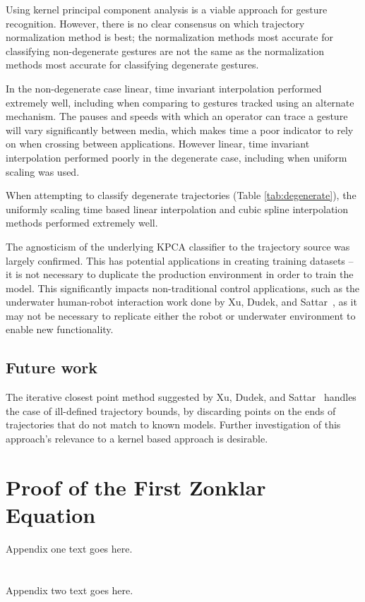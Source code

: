 \documentclass[12pt,journal,compsoc]{IEEEtran}
\begin{document}
Using kernel principal component analysis is a viable approach for gesture recognition. 
However, there is no clear consensus on which trajectory normalization method is best;
the normalization methods most accurate for classifying non-degenerate gestures are not
the same as the normalization methods most accurate for classifying degenerate gestures.
\par
In the non-degenerate case linear, time invariant interpolation performed extremely well,
including when comparing to gestures tracked using an alternate mechanism. The pauses and
speeds with which an operator can trace a gesture will vary significantly between media, which
makes time a poor indicator to rely on when crossing between applications. However linear,
time invariant interpolation performed poorly in the degenerate case, including when
uniform scaling was used.
\par
When attempting to classify degenerate trajectories (Table \ref{tab:degenerate}),
the uniformly scaling time based linear interpolation and cubic spline interpolation
methods performed extremely well.
\par
The agnosticism of the underlying KPCA classifier to the trajectory source was
largely confirmed. This has potential applications in creating training datasets --
it is not necessary to duplicate the production environment in order to train the model.
This significantly impacts non-traditional control applications, such as the underwater
human-robot interaction work done by Xu, Dudek, and Sattar~\cite{xu08}, as it may not
be necessary to replicate either the robot or underwater environment to enable new
functionality.

\subsection{Future work}

The iterative closest point method suggested by Xu, Dudek, and Sattar~\cite{xu08}
handles the case of ill-defined trajectory bounds, by discarding points on the ends
of trajectories that do not match to known models. Further investigation of this
approach's relevance to a kernel based approach is desirable.


\nocite{*}

{}

\appendices
\section{Proof of the First Zonklar Equation}
Appendix one text goes here.

\section{}
Appendix two text goes here.
\end{document}
